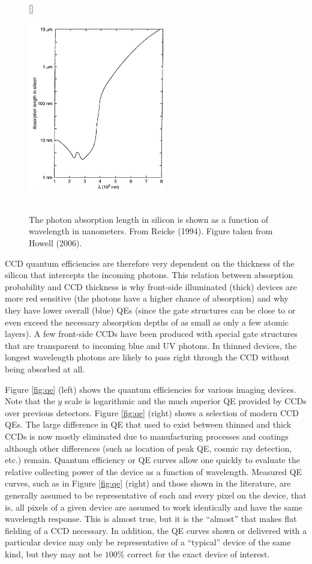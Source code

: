 \documentclass[a4paper,10pt]{article}
\begin{document}
\begin{figure}[t]
    [\FBwidth]
    {\caption{\footnotesize{\\The photon absorption length in silicon is shown as a function of wavelength in nanometers. From Reicke (1994). Figure taken from Howell (2006).}}
    \label{fig:siabsorptionlength}}
    {\includegraphics[width=6cm]{figures/SiAbsorptionLength.png}}
\end{figure}

{\noindent}CCD quantum efficiencies are therefore very dependent on the thickness of the silicon that intercepts the incoming photons. This relation between absorption probability and CCD thickness is why front-side illuminated (thick) devices are more red sensitive (the photons have a higher chance of absorption) and why they have lower overall (blue) QEs (since the gate structures can be close to or even exceed the necessary absorption depths of as small as only a few atomic layers). A few front-side CCDs have been produced with special gate structures that are transparent to incoming blue and UV photons. In thinned devices, the longest wavelength photons are likely to pass right through the CCD without being absorbed at all.

{\noindent}Figure \ref{fig:qe} (left) shows the quantum efficiencies for various imaging devices. Note that the $y$ scale is logarithmic and the much superior QE provided by CCDs over previous detectors. Figure \ref{fig:qe} (right) shows a selection of modern CCD QEs. The large difference in QE that used to exist between thinned and thick CCDs is now mostly eliminated due to manufacturing processes and coatings although other differences (such as location of peak QE, cosmic ray detection, etc.) remain. Quantum efficiency or QE curves allow one quickly to evaluate the relative collecting power of the device as a function of wavelength. Measured QE curves, such as in Figure \ref{fig:qe} (right) and those shown in the literature, are generally assumed to be representative of each and every pixel on the device, that is, all pixels of a given device are assumed to work identically and have the same wavelength response. This is almost true, but it is the ``almost'' that makes flat fielding of a CCD necessary. In addition, the QE curves shown or delivered with a particular device may only be representative of a ``typical'' device of the same kind, but they may not be $100\%$ correct for the exact device of interest.
\end{document}
